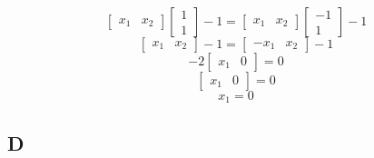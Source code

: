 \documentclass[12pt]{article}
\begin{document}
\[
    \begin{bmatrix} x_1 & x_2\end{bmatrix}\begin{bmatrix} 1 \\ 1\end{bmatrix}-1
    =
    \begin{bmatrix} x_1 & x_2\end{bmatrix}\begin{bmatrix} -1 \\ 1\end{bmatrix}-1
\]
\[
    \begin{bmatrix} x_1 & x_2\end{bmatrix}-1
    =
    \begin{bmatrix} -x_1 & x_2\end{bmatrix}-1
\]
\[
    -2\begin{bmatrix} x_1 & 0\end{bmatrix} = 0
\]
\[
    \begin{bmatrix} x_1 & 0\end{bmatrix} = 0
\]
\[
    x_1 = 0
\]

\subsection{D}
\end{document}
